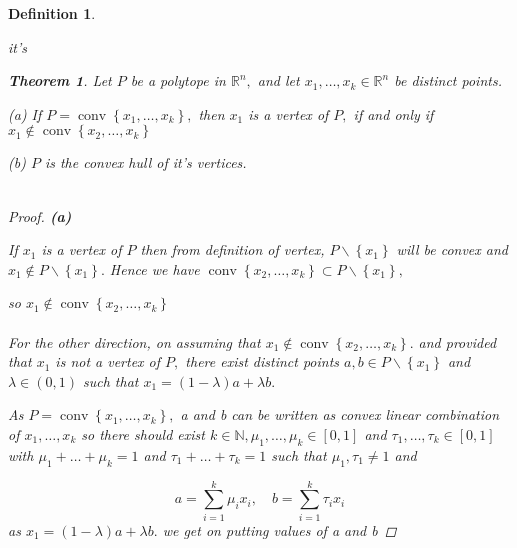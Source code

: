 \documentclass[oneside]{book}
\newtheorem{theorem}{Theorem}[section]
\newtheorem{mydef}{Definition}
\begin{document}
\begin{mydef} \label{d:7}

it's










\begin{theorem}
\label{t:6}
Let $P$ be a polytope in $\mathbb{R}^{n},$ and let $x_{1}, \ldots, x_{k} \in \mathbb{R}^{n}$ be distinct points.\par
(a) If $P=\operatorname{conv}\left\{x_{1}, \ldots, x_{k}\right\},$ then $x_{1}$ is a vertex of $P,$ if and only if $x_{1} \notin \operatorname{conv}\left\{x_{2}, \ldots, x_{k}\right\}$ \par
(b) $P$ is the convex hull of it's vertices. \\\\

\begin{proof}

\textbf{(a)}  \par 


 If  $x_{1}$ is a vertex of $P $ then  from definition of vertex, $P \backslash\left\{x_{1}\right\}$ will be convex and $x_{1} \notin P \backslash\left\{x_{1}\right\} .$ Hence we have  $\operatorname{conv}\left\{x_{2}, \ldots, x_{k}\right\} \subset P \backslash\left\{x_{1}\right\},$ 
 \par 
 so  $x_{1} \notin \operatorname{conv}\left\{x_{2}, \ldots, x_{k}\right\}$ \\\\
For the other direction, on assuming that $x_{1} \notin \operatorname{conv}\left\{x_{2}, \ldots, x_{k}\right\} .$ and provided that  $x_{1}$ is not a vertex of $P,$ there exist distinct points $a, b \in P \backslash\left\{x_{1}\right\}$ and $\lambda \in(0,1)$ such that $x_{1}=(1-\lambda) a+\lambda b .$ 

As  $P=\operatorname{conv}\left\{x_{1}, \ldots, x_{k}\right\},$ a and b can be written as convex linear combination of $x_{1},\ldots ,x_{k} $   so there should exist $k \in \mathbb{N}, \mu_{1}, \ldots, \mu_{k} \in[0,1]$ and $\tau_{1}, \ldots, \tau_{k} \in[0,1]$ with $\mu_{1}+\ldots+\mu_{k}=1$ and $\tau_{1}+\ldots+\tau_{k}=1$
such that $\mu_{1}, \tau_{1} \neq 1$ and \par
\begin{equation}
\label{eq37}
a=\sum_{i=1}^{k} \mu_{i} x_{i}, \quad b=\sum_{i=1}^{k} \tau_{i} x_{i}
\end{equation}  
as $x_{1}=(1-\lambda) a+\lambda b .$ we get on putting values of a and b 


\end{proof}
\end{theorem}
\end{mydef}
\end{document}
